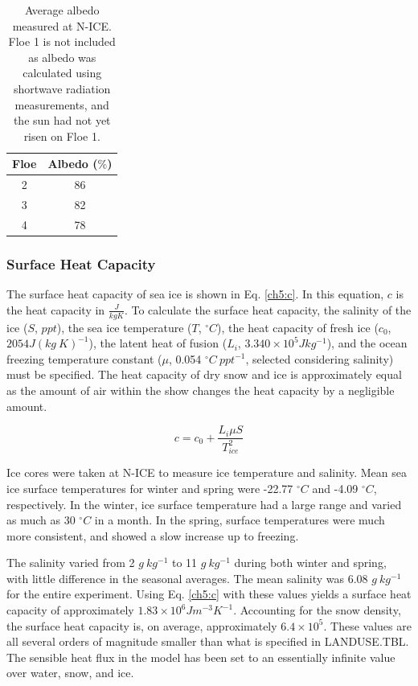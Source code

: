 \begin{table}[t]
\centering
\footnotesize
\doublespacing 
{
\begin{tabular}{| c | c |}
 \hline
\rowcolor[HTML]{F3F3F3} \textbf{Floe} & \textbf{Albedo ($\%$)} \\
\hline
2 & 86 \\
3 & 82 \\
4 & 78 \\
 \hline
\end{tabular}}
\caption[N-ICE average measured albedo.]{Average albedo measured at N-ICE. Floe 1 is not included as albedo was calculated using shortwave radiation measurements, and the sun had not yet risen on Floe 1.}
\label{tab:albedos}
\end{table}

\subsubsection{Surface Heat Capacity}
The surface heat capacity of sea ice is shown in Eq. \ref{ch5:c}. In this equation, $c$ is the heat capacity in $\frac{J}{kg K}$. To calculate the surface heat capacity, the salinity of the ice ($S$, $ppt$), the sea ice temperature ($T$, $^{\circ} C$), the heat capacity of fresh ice ($c_{0}$, $2054 J(kg~K)^{-1}$), the latent heat of fusion ($L_{i}$, $3.340 \times 10^{5} Jkg^{-1}$), and the ocean freezing temperature constant ($\mu$, 0.054 $^{\circ}C~ppt^{-1}$, selected considering salinity) must be specified. The heat capacity of dry snow and ice is approximately equal as the amount of air within the show changes the heat capacity by a negligible amount. 

\begin{equation}\label{ch5:c}
c = c_{0} + \frac{L_{i}\mu S}{T_{ice}^{2}}
\end{equation}

Ice cores were taken at N-ICE to measure ice temperature and salinity. Mean sea ice surface temperatures for winter and spring were -22.77 $^{\circ}C$ and -4.09 $^{\circ}C$, respectively. In the winter, ice surface temperature had a large range and varied as much as 30 $^{\circ}C$ in a month. In the spring, surface temperatures were much more consistent, and showed a slow increase up to freezing.

The salinity varied from 2 $g~kg^{-1}$ to 11 $g~kg^{-1}$ during both winter and spring, with little difference in the seasonal averages. The mean salinity was 6.08 $g~kg^{-1}$ for the entire experiment. Using Eq. \ref{ch5:c} with these values yields a surface heat capacity of approximately $1.83 \times 10^{6} Jm^{-3}K^{-1}$. Accounting for the snow density, the surface heat capacity is, on average, approximately $6.4 \times 10^{5}$. These values are all several orders of magnitude smaller than what is specified in LANDUSE.TBL. The sensible heat flux in the model has been set to an essentially infinite value over water, snow, and ice.

